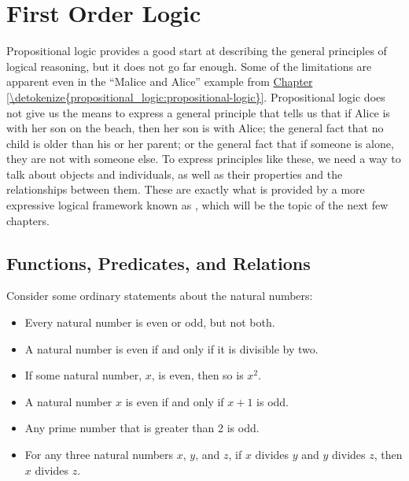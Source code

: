 \documentclass[letterpaper,10pt,english]{sphinxmanual}
\begin{document}
\chapter{First Order Logic}
\label{\detokenize{first_order_logic:first-order-logic}}\label{\detokenize{first_order_logic:id1}}\label{\detokenize{first_order_logic::doc}}
\sphinxAtStartPar
Propositional logic provides a good start at describing the general principles of logical reasoning, but it does not go far enough. Some of the limitations are apparent even in the “Malice and Alice” example from \hyperref[\detokenize{propositional_logic:propositional-logic}]{Chapter \ref{\detokenize{propositional_logic:propositional-logic}}}. Propositional logic does not give us the means to express a general principle that tells us that if Alice is with her son on the beach, then her son is with Alice; the general fact that no child is older than his or her parent; or the general fact that if someone is alone, they are not with someone else. To express principles like these, we need a way to talk about objects and individuals, as well as their properties and the relationships between them. These are exactly what is provided by a more expressive logical framework known as , which will be the topic of the next few chapters.


\section{Functions, Predicates, and Relations}
\label{\detokenize{first_order_logic:functions-predicates-and-relations}}\label{\detokenize{first_order_logic:id2}}
\sphinxAtStartPar
Consider some ordinary statements about the natural numbers:
\begin{itemize}
\item {} 
\sphinxAtStartPar
Every natural number is even or odd, but not both.

\item {} 
\sphinxAtStartPar
A natural number is even if and only if it is divisible by two.

\item {} 
\sphinxAtStartPar
If some natural number, \(x\), is even, then so is \(x^2\).

\item {} 
\sphinxAtStartPar
A natural number \(x\) is even if and only if \(x + 1\) is odd.

\item {} 
\sphinxAtStartPar
Any prime number that is greater than 2 is odd.

\item {} 
\sphinxAtStartPar
For any three natural numbers \(x\), \(y\), and \(z\), if \(x\) divides \(y\) and \(y\) divides \(z\), then \(x\) divides \(z\).

\end{itemize}
\end{document}
